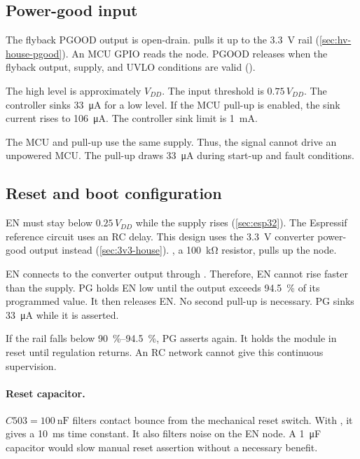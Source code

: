 \subsection{Power-good input}
\label{sec:esp32-pgood}

The flyback PGOOD output is open-drain.  pulls it up to the 3.3~V
rail (\cref{sec:hv-house-pgood}). An MCU GPIO reads the node. PGOOD releases
when the flyback output, supply, and UVLO conditions are valid
().

The high level is approximately \(V_{DD}\). The input threshold is
\(0.75\,V_{DD}\). The controller sinks \SI{33}{\micro\ampere} for a low level.
If the MCU pull-up is enabled, the sink current rises to
\SI{106}{\micro\ampere}. The controller sink limit is
\SI{1}{\milli\ampere}.

The MCU and pull-up use the same supply. Thus, the signal cannot drive an
unpowered MCU. The pull-up draws \SI{33}{\micro\ampere} during start-up and
fault conditions.

\subsection{Reset and boot configuration}
\label{sec:esp32-reset}

EN must stay below \(0.25\,V_{DD}\) while the supply rises
(\cref{sec:esp32}). The Espressif reference circuit uses an RC delay. This
design uses the 3.3~V converter power-good output instead
(\cref{sec:3v3-house}). , a \SI{100}{\kilo\ohm} resistor,
pulls up the node.

EN connects to the converter output through . Therefore, EN
cannot rise faster than the supply. PG holds EN low until the output exceeds
\SI{94.5}{\percent} of its programmed value. It then releases EN. No second
pull-up is necessary. PG sinks \SI{33}{\micro\ampere} while it is asserted.

If the rail falls below \SIrange{90}{94.5}{\percent}, PG asserts again. It
holds the module in reset until regulation returns. An RC network cannot give
this continuous supervision.

\paragraph{Reset capacitor.} \(C503 = \SI{100}{\nano\farad}\) filters contact
bounce from the mechanical reset switch. With , it gives a
\SI{10}{\milli\second} time constant. It also filters noise on the EN node. A
\SI{1}{\micro\farad} capacitor would slow manual reset assertion without a
necessary benefit.


